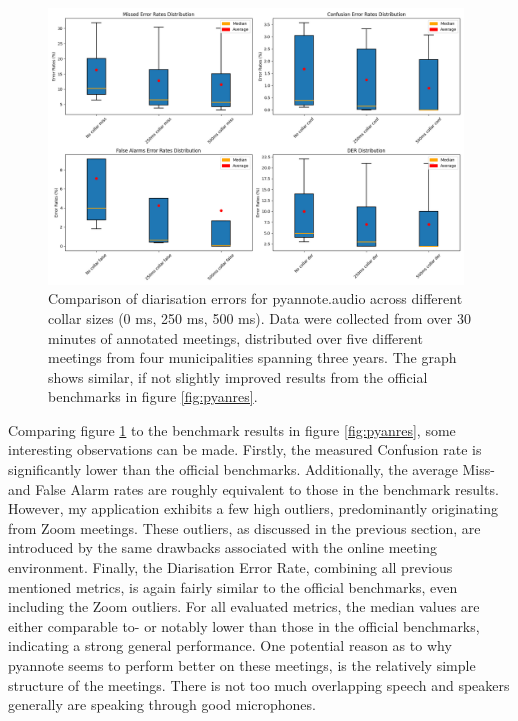 \documentclass[twoside]{uva-inf-bachelor-thesis}
\begin{document}
\begin{figure}
    \centering
    \includegraphics[width=0.98\textwidth]{images/error_rates_box_plots.png}
    \caption{Comparison of diarisation errors for pyannote.audio across different collar sizes (0 ms, 250 ms, 500 ms). Data were collected from over 30 minutes of annotated meetings, distributed over five different meetings from four municipalities spanning three years. The graph shows similar, if not slightly improved results from the official benchmarks in figure \ref{fig:pyanres}.}
    \label{fig:pyanExperiment}
\end{figure}

Comparing figure \ref{fig:pyanExperiment} to the benchmark results in figure \ref{fig:pyanres}, some interesting observations can be made. 
Firstly, the measured Confusion rate is significantly lower than the official benchmarks. Additionally, the average Miss- and False Alarm rates are roughly equivalent to those in the benchmark results. However, my application exhibits a few high outliers, predominantly originating from Zoom meetings. These outliers, as discussed in the previous section, are introduced by the same drawbacks associated with the online meeting environment.
Finally, the Diarisation Error Rate, combining all previous mentioned metrics, is again fairly similar to the official benchmarks, even including the Zoom outliers. 
For all evaluated metrics, the median values are either comparable to- or notably lower than those in the official benchmarks, indicating a strong general performance.
One potential reason as to why pyannote seems to perform better on these meetings, is the relatively simple structure of the meetings. There is not too much overlapping speech and speakers generally are speaking through good microphones.
\end{document}

